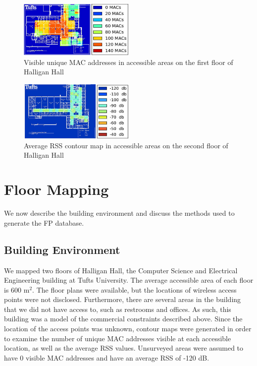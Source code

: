 \documentclass[conference]{IEEEtran}
\begin{document}
\begin{figure}[t!]
  \centering
    \includegraphics[width=0.5\textwidth]{APContour}
    \caption{Visible unique MAC addresses in accessible areas on the first floor of Halligan Hall}
    \label{fig:visible_unique_macs}
\end{figure}


\begin{figure}[t!]
  \centering
    \includegraphics[width=0.5\textwidth]{dbContour}
   \caption{Average RSS contour map in accessible areas on the second floor of Halligan Hall}
   \label{fig:rss_contour_map}
\end{figure}

\section{Floor Mapping}
We now describe the building environment and discuss the methods used to generate the FP database.
\subsection{Building Environment}
We mapped two floors of Halligan Hall, the Computer Science and Electrical Engineering building at Tufts University. The average accessible area of each floor is 600 m$^2$. The floor plans were available, but the locations of wireless access points were not disclosed. Furthermore, there are several areas in the building that we did not have access to, such as restrooms and offices. As such, this building was a model of the commercial constraints described above. Since the location of the access points was unknown, contour maps were generated in order to examine the number of unique MAC addresses visible at each accessible location, as well as the average RSS values. Unsurveyed areas were assumed to have 0 visible MAC addresses and have an average RSS of -120 dB. 
 
\end{document}
